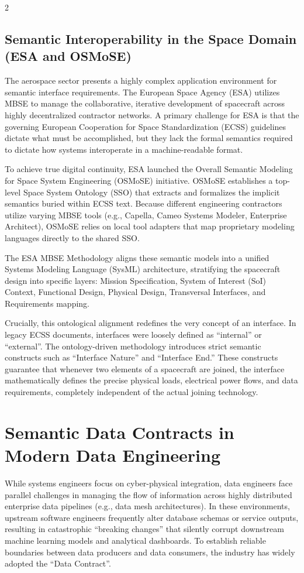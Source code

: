\documentclass[11pt,letterpaper]{article}
\begin{document}
\begin{multicols*}{2}
\subsection{Semantic Interoperability in the Space Domain (ESA and OSMoSE)}
The aerospace sector presents a highly complex application environment for semantic interface requirements. The European Space Agency (ESA) utilizes MBSE to manage the collaborative, iterative development of spacecraft across highly decentralized contractor networks. A primary challenge for ESA is that the governing European Cooperation for Space Standardization (ECSS) guidelines dictate what must be accomplished, but they lack the formal semantics required to dictate how systems interoperate in a machine-readable format.

To achieve true digital continuity, ESA launched the Overall Semantic Modeling for Space System Engineering (OSMoSE) initiative. OSMoSE establishes a top-level Space System Ontology (SSO) that extracts and formalizes the implicit semantics buried within ECSS text. Because different engineering contractors utilize varying MBSE tools (e.g., Capella, Cameo Systems Modeler, Enterprise Architect), OSMoSE relies on local tool adapters that map proprietary modeling languages directly to the shared SSO.

The ESA MBSE Methodology aligns these semantic models into a unified Systems Modeling Language (SysML) architecture, stratifying the spacecraft design into specific layers: Mission Specification, System of Interest (SoI) Context, Functional Design, Physical Design, Transversal Interfaces, and Requirements mapping.

Crucially, this ontological alignment redefines the very concept of an interface. In legacy ECSS documents, interfaces were loosely defined as ``internal'' or ``external''. The ontology-driven methodology introduces strict semantic constructs such as ``Interface Nature'' and ``Interface End.'' These constructs guarantee that whenever two elements of a spacecraft are joined, the interface mathematically defines the precise physical loads, electrical power flows, and data requirements, completely independent of the actual joining technology.

\section{Semantic Data Contracts in Modern Data Engineering}
While systems engineers focus on cyber-physical integration, data engineers face parallel challenges in managing the flow of information across highly distributed enterprise data pipelines (e.g., data mesh architectures). In these environments, upstream software engineers frequently alter database schemas or service outputs, resulting in catastrophic ``breaking changes'' that silently corrupt downstream machine learning models and analytical dashboards. To establish reliable boundaries between data producers and data consumers, the industry has widely adopted the ``Data Contract''.


\end{multicols*}
\end{document}
